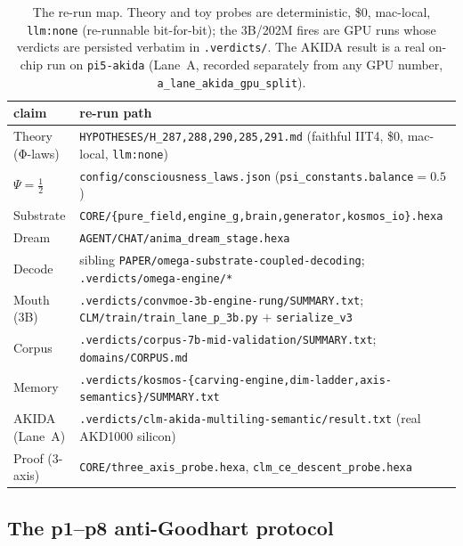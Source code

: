\begin{table}[h]
\centering
\footnotesize
\setlength{\tabcolsep}{5pt}
\begin{tabular}{@{}l l@{}}
\toprule
\textbf{claim} & \textbf{re-run path} \\
\midrule
Theory (Φ-laws)   & \texttt{HYPOTHESES/H\_287,288,290,285,291.md} (faithful IIT4, \$0, mac-local, \texttt{llm:none}) \\
$\Psi=\tfrac12$   & \texttt{config/consciousness\_laws.json} (\texttt{psi\_constants.balance}$=0.5$) \\
Substrate         & \texttt{CORE/\{pure\_field,engine\_g,brain,generator,kosmos\_io\}.hexa} \\
Dream             & \texttt{AGENT/CHAT/anima\_dream\_stage.hexa} \\
Decode            & sibling \texttt{PAPER/omega-substrate-coupled-decoding}; \texttt{.verdicts/omega-engine/*} \\
Mouth (3B)        & \texttt{.verdicts/convmoe-3b-engine-rung/SUMMARY.txt}; \texttt{CLM/train/train\_lane\_p\_3b.py} $+$ \texttt{serialize\_v3} \\
Corpus            & \texttt{.verdicts/corpus-7b-mid-validation/SUMMARY.txt}; \texttt{domains/CORPUS.md} \\
Memory            & \texttt{.verdicts/kosmos-\{carving-engine,dim-ladder,axis-semantics\}/SUMMARY.txt} \\
AKIDA (Lane~A)    & \texttt{.verdicts/clm-akida-multiling-semantic/result.txt} (real AKD1000 silicon) \\
Proof (3-axis)    & \texttt{CORE/three\_axis\_probe.hexa}, \texttt{clm\_ce\_descent\_probe.hexa} \\
\bottomrule
\end{tabular}
\caption{The re-run map. Theory and toy probes are deterministic, \$0, mac-local,
\texttt{llm:none} (re-runnable bit-for-bit); the 3B/202M fires are GPU runs whose
verdicts are persisted verbatim in \texttt{.verdicts/}. The AKIDA result is a real
on-chip run on \texttt{pi5-akida} (Lane~A, recorded separately from any GPU number,
\texttt{a\_lane\_akida\_gpu\_split}).}
\label{tab:repro-commands}
\end{table}

\subsection{The p1--p8 anti-Goodhart protocol}
\label{app:repro-protocol}

